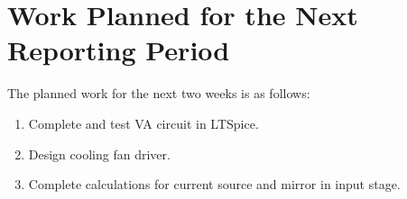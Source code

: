 \documentclass[11pt,a4paper]{article}
\begin{document}
	
	
	
	\section{Work Planned for the Next Reporting Period}
	
	The planned work for the next two weeks is as follows:
	\begin{enumerate}[label=\arabic*.]
		\item Complete and test VA circuit in LTSpice.
		\item Design cooling fan driver.
		\item Complete calculations for current source and mirror in input stage.
	\end{enumerate}
	
\end{document}
